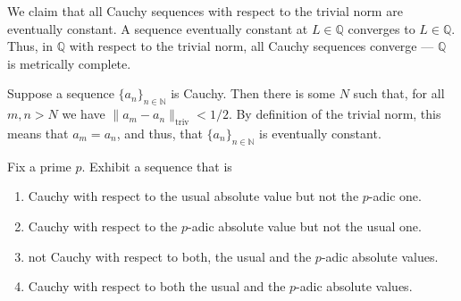 \documentclass[12 pt, letterpaper]{hmcpset}
\begin{document}
\begin{solution}
	We claim that all Cauchy sequences with respect to the trivial norm are eventually constant. A sequence eventually constant at $L \in \mathbb{Q}$ converges to $L \in \mathbb{Q}$. Thus, in $\mathbb{Q}$ with respect to the trivial norm, all Cauchy sequences converge --- $\mathbb{Q}$ is metrically complete.

	Suppose a sequence $\{ a_{n} \}_{n \in \mathbb{N}}$ is Cauchy. Then there is some $N$ such that, for all $m, n > N$ we have $\lVert a_{m} - a_{n} \rVert_{\text{triv}} < 1 / 2$. By definition of the trivial norm, this means that $a_{m} = a_{n}$, and thus, that $\{ a_{n} \}_{n \in \mathbb{N}}$ is eventually constant.
\end{solution}

\pagebreak

\begin{problem}[(11)]
	Fix a prime $p$. Exhibit a sequence that is
	\begin{enumerate}
		\item Cauchy with respect to the usual absolute value but not the $p$-adic one.
		\item Cauchy with respect to the $p$-adic absolute value but not the usual one.
		\item not Cauchy with respect to both, the usual and the $p$-adic absolute values.
		\item Cauchy with respect to both the usual and the $p$-adic absolute values.
	\end{enumerate}
\end{problem}
\end{document}
